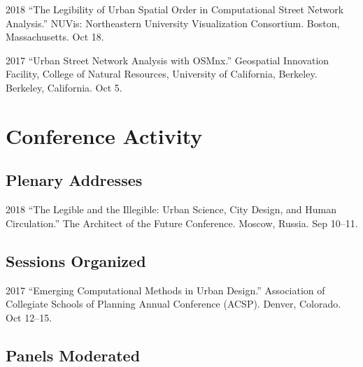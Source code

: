 \documentclass[12pt,letterpaper]{report}
\begin{document}
	\begin{tablist}
		
		\item[2018] \tab \enquote{The Legibility of Urban Spatial Order in Computational Street Network Analysis.} NUVis: Northeastern University Visualization Consortium. Boston, Massachusetts. Oct 18.
		
		\item[2017] \tab \enquote{Urban Street Network Analysis with OSMnx.} Geospatial Innovation Facility, College of Natural Resources, University of California, Berkeley. Berkeley, California. Oct 5.
		
	\end{tablist}
	
	
	\section*{Conference Activity}
	
	\subsection*{Plenary Addresses}
	
	\begin{tablist}
		
		\item[2018] \tab \enquote{The Legible and the Illegible: Urban Science, City Design, and Human Circulation.} The Architect of the Future Conference. Moscow, Russia. Sep 10--11.
		
	\end{tablist}
	
	\subsection*{Sessions Organized}
	
	\begin{tablist}
		
		\item[2017] \tab \enquote{Emerging Computational Methods in Urban Design.} Association of Collegiate Schools of Planning Annual Conference (ACSP). Denver, Colorado. Oct 12--15.
		
	\end{tablist}
	
	\subsection*{Panels Moderated}
	
\end{document}

